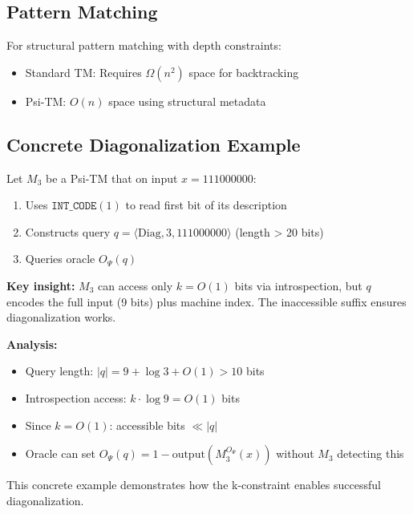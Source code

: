 \documentclass[11pt]{article}
\begin{document}
\subsection{Pattern Matching}

\begin{example}
For structural pattern matching with depth constraints:
\begin{itemize}
\item Standard TM: Requires $\Omega(n^2)$ space for backtracking
\item Psi-TM: $O(n)$ space using structural metadata
\end{itemize}
\end{example}

\subsection{Concrete Diagonalization Example}

\begin{example}
\label{ex:concrete-diagonalization}
Let $M_3$ be a Psi-TM that on input $x = 111000000$:
\begin{enumerate}
\item Uses $\texttt{INT\_CODE}(1)$ to read first bit of its description
\item Constructs query $q = \langle \text{Diag}, 3, 111000000 \rangle$ (length > 20 bits)
\item Queries oracle $O_\Psi(q)$
\end{enumerate}

\textbf{Key insight:} $M_3$ can access only $k=O(1)$ bits via introspection, but $q$ encodes the full input (9 bits) plus machine index. The inaccessible suffix ensures diagonalization works.

\textbf{Analysis:}
\begin{itemize}
\item Query length: $|q| = 9 + \log 3 + O(1) > 10$ bits
\item Introspection access: $k \cdot \log 9 = O(1)$ bits
\item Since $k = O(1)$: accessible bits $\ll |q|$
\item Oracle can set $O_\Psi(q) = 1 - \text{output}(M_3^{O_\Psi}(x))$ without $M_3$ detecting this
\end{itemize}

This concrete example demonstrates how the k-constraint enables successful diagonalization.
\end{example}
\end{document}
